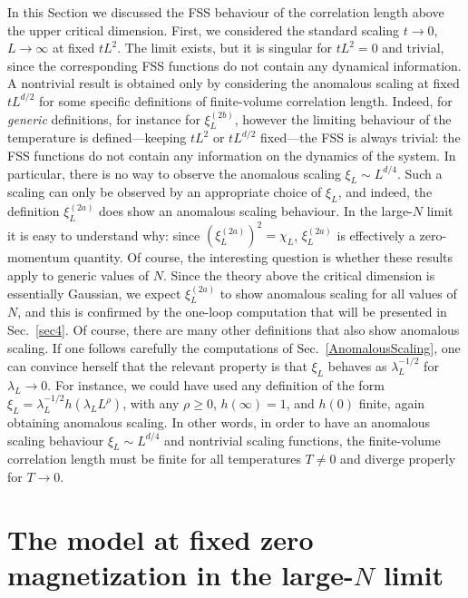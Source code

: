\documentclass[12pt]{article}
\begin{document}
In this Section we discussed the FSS behaviour of the correlation length 
above the upper critical 
dimension. First, we considered 
the standard scaling $t\to 0$, $L\to \infty$ at fixed $t L^2$. 
The limit exists, but it is singular for $t L^2 = 0$ and trivial,
since the corresponding FSS functions do not contain any dynamical 
information.
A nontrivial result is obtained only by considering the anomalous 
scaling at fixed $t L^{d/2}$ for some specific definitions of 
finite-volume correlation length. Indeed,
for {\em generic} definitions, 
for instance for $\xi^{(2b)}_L$,
however the limiting behaviour of the temperature 
is defined---keeping $t L^2$ or $t L^{d/2}$ fixed---the FSS is always trivial:
the FSS functions do not contain any information on the dynamics of the 
system. In particular, there is no way to observe the anomalous scaling 
$\xi_L\sim L^{d/4}$. Such a scaling can only be observed by an appropriate
choice of $\xi_L$, and indeed, the definition 
$\xi^{(2a)}_L$ does show an anomalous scaling behaviour. 
In the large-$N$ limit
it is easy to understand why: since $(\xi^{(2a)}_L)^2 = \chi_L$, 
$\xi^{(2a)}_L$ is effectively a zero-momentum quantity. 
Of course, the interesting question is whether these results apply to generic 
values of $N$. Since the theory above the critical dimension is 
essentially Gaussian, we expect $\xi^{(2a)}_L$  to show anomalous 
scaling for all values of $N$, and this is 
confirmed by the one-loop computation that will be presented in
Sec.~\ref{sec4}.  
Of course, there are many other definitions
that also show anomalous scaling. If one follows carefully the
computations of Sec.~\ref{AnomalousScaling}, one can convince herself
that the relevant  
property is that $\xi_L$ behaves as $\lambda^{-1/2}_L$ for 
$\lambda_L\to 0$. For instance, we could have used any definition 
of the form $\xi_L = \lambda^{-1/2}_L h(\lambda_L L^\rho)$, 
with any $\rho\ge 0$, $h(\infty)=1$, and $h(0)$ finite, again obtaining 
anomalous scaling. In other words, in order to have an anomalous scaling
behaviour $\xi_L\sim L^{d/4}$ and nontrivial scaling functions, 
the finite-volume correlation length
must be finite for all temperatures $T\not=0$ and diverge properly 
for $T\to 0$.

\section{The model at fixed zero magnetization in the large-$N$ limit}
\end{document}
